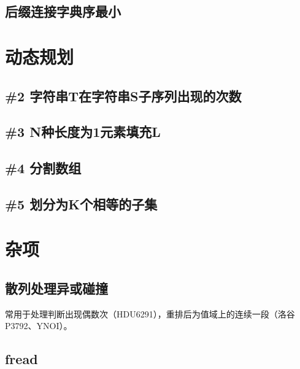 \documentclass[landscape,twocolumn,a4paper]{article}
\begin{document}
\subsection{后缀连接字典序最小}



\section{动态规划}

\subsection{\#2 字符串T在字符串S子序列出现的次数}

\subsection{\#3 N种长度为1元素填充L}

\subsection{\#4 分割数组}

\subsection{\#5 划分为K个相等的子集}



\section{杂项}
\subsection{散列处理异或碰撞}
常用于处理判断出现偶数次（HDU6291），重排后为值域上的连续一段（洛谷P3792、YNOI）。


\subsection{fread}


\end{document}
